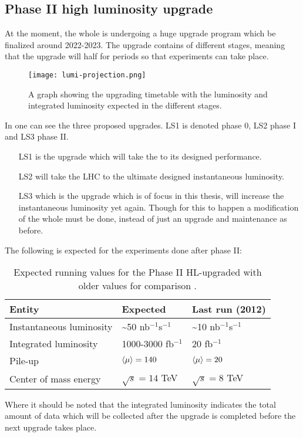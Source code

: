 \subsection{Phase II high luminosity upgrade}\label{sec:eo:subsec:hlu}
At the moment, the whole \abbrLHC is undergoing a huge upgrade program which be finalized around 2022-2023. The upgrade contains of different stages, meaning that the upgrade will half for periods so that experiments can take place. 
\begin{figure}[ht]
\texttt{[image: lumi-projection.png]}
\caption{A graph showing the upgrading timetable with the luminosity and integrated luminosity expected in the different stages.}
\label{fig:upgt}
\end{figure}
In  one can see the three proposed upgrades. LS1 is denoted phase 0, LS2 phase I and LS3 phase II. 
\begin{itemize}
\item[LS1] is the upgrade which will take the \abbrLHC to its designed performance. 

\item[LS2] will take the LHC to the ultimate designed instantaneous luminosity. 
\item[LS3] which is the upgrade which is of focus in this thesis, will increase the instantaneous luminosity yet again. Though for this to happen a modification of the whole \abbrLHC must be done, instead of just an upgrade and maintenance as before.
\end{itemize}
The following is expected for the experiments done after phase II:
\renewcommand{\arraystretch}{1.5} %
\begin{table}[H]
\begin{center}
    \begin{tabular}{ | l | l | l |}
    \hline
    Entity & Expected & Last run (2012) \\ \hline
    Instantaneous luminosity & \textasciitilde 50 nb$^{-1}$s$^{-1}$ & \textasciitilde 10 nb$^{-1}$s$^{-1}$ \\ \hline  
    Integrated luminosity & 1000-3000 fb$^{-1}$ & 20 fb$^{-1}$ \\ \hline
  	Pile-up & $\left<\mu\right>=140$ & $\left<\mu\right>=20$ \\ \hline
  	Center of mass energy & $\sqrt{s}=14$ TeV &  $\sqrt{s}=8$ TeV \\ \hline
  	\end{tabular}
  	
  	\caption{Expected running values for the Phase II HL-upgraded \abbrLHC with older values for comparison \citep{HL:2013}.}
  	\label{tab:expectvalues}
  	\end{center}
    \end{table}
    \renewcommand{\arraystretch}{1.0}  %
Where it should be noted that the integrated luminosity indicates the total amount of data which will be collected after the upgrade is completed before the next upgrade takes place. 

